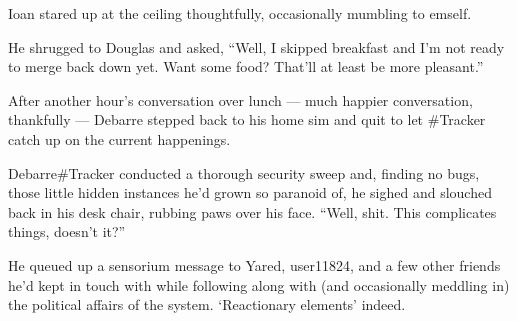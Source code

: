 Ioan stared up at the ceiling thoughtfully, occasionally mumbling to emself.

He shrugged to Douglas and asked, ``Well, I skipped breakfast and I'm not ready to merge back down yet. Want some food? That'll at least be more pleasant.''

After another hour's conversation over lunch — much happier conversation, thankfully — Debarre stepped back to his home sim and quit to let \#Tracker catch up on the current happenings.

Debarre\#Tracker conducted a thorough security sweep and, finding no bugs, those little hidden instances he'd grown so paranoid of, he sighed and slouched back in his desk chair, rubbing paws over his face. ``Well, shit. This complicates things, doesn't it?''

He queued up a sensorium message to Yared, user11824, and a few other friends he'd kept in touch with while following along with (and occasionally meddling in) the political affairs of the system. `Reactionary elements' indeed.
